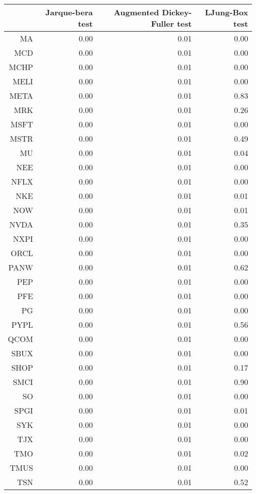 \begin{table}[ht]
\centering
\begin{tabular}{rrrr}
  \hline
 & Jarque-bera test & Augmented Dickey-Fuller test & LJung-Box test \\ 
  \hline
MA & 0.00 & 0.01 & 0.00 \\ 
  MCD & 0.00 & 0.01 & 0.00 \\ 
  MCHP & 0.00 & 0.01 & 0.00 \\ 
  MELI & 0.00 & 0.01 & 0.00 \\ 
  META & 0.00 & 0.01 & 0.83 \\ 
  MRK & 0.00 & 0.01 & 0.26 \\ 
  MSFT & 0.00 & 0.01 & 0.00 \\ 
  MSTR & 0.00 & 0.01 & 0.49 \\ 
  MU & 0.00 & 0.01 & 0.04 \\ 
  NEE & 0.00 & 0.01 & 0.00 \\ 
  NFLX & 0.00 & 0.01 & 0.00 \\ 
  NKE & 0.00 & 0.01 & 0.01 \\ 
  NOW & 0.00 & 0.01 & 0.01 \\ 
  NVDA & 0.00 & 0.01 & 0.35 \\ 
  NXPI & 0.00 & 0.01 & 0.00 \\ 
  ORCL & 0.00 & 0.01 & 0.00 \\ 
  PANW & 0.00 & 0.01 & 0.62 \\ 
  PEP & 0.00 & 0.01 & 0.00 \\ 
  PFE & 0.00 & 0.01 & 0.00 \\ 
  PG & 0.00 & 0.01 & 0.00 \\ 
  PYPL & 0.00 & 0.01 & 0.56 \\ 
  QCOM & 0.00 & 0.01 & 0.00 \\ 
  SBUX & 0.00 & 0.01 & 0.00 \\ 
  SHOP & 0.00 & 0.01 & 0.17 \\ 
  SMCI & 0.00 & 0.01 & 0.90 \\ 
  SO & 0.00 & 0.01 & 0.00 \\ 
  SPGI & 0.00 & 0.01 & 0.01 \\ 
  SYK & 0.00 & 0.01 & 0.00 \\ 
  TJX & 0.00 & 0.01 & 0.00 \\ 
  TMO & 0.00 & 0.01 & 0.02 \\ 
  TMUS & 0.00 & 0.01 & 0.00 \\ 
  TSN & 0.00 & 0.01 & 0.52 \\ 

\end{tabular}
\end{table}
